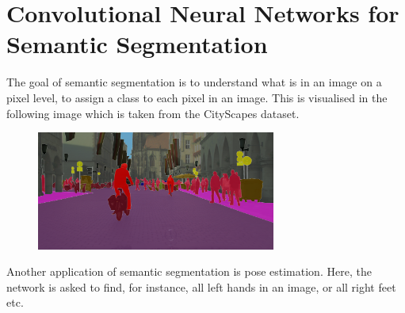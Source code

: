 \section{Convolutional Neural Networks for Semantic Segmentation}%
\label{sec:unet}%
The goal of semantic segmentation is to understand what is in an image on a
pixel level, \ie to assign a class to each pixel in an image. This is visualised
in the following image which is taken from the CityScapes dataset.
\begin{figure}[H]
  \centering \includegraphics[width=0.7\textwidth]{Figures/cityscapes}
\end{figure}
Another application of semantic segmentation is pose estimation. Here, the
network is asked to find, for instance, all left hands in an image, or all right
feet etc.

